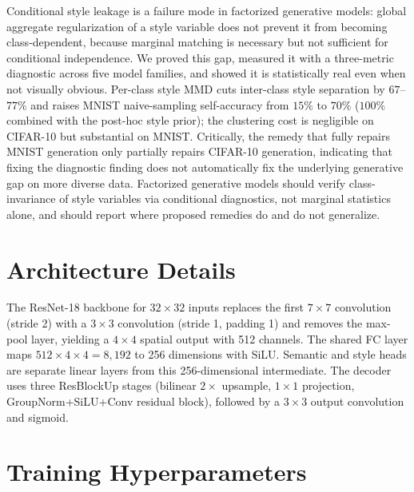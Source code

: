 \documentclass[10pt,letterpaper]{article}
\begin{document}
Conditional style leakage is a failure mode in factorized generative models:
global aggregate regularization of a style variable does not prevent it from
becoming class-dependent, because marginal matching is necessary but not
sufficient for conditional independence. We proved this gap, measured it
with a three-metric diagnostic across five model families, and showed it is
statistically real even when not visually obvious. Per-class style MMD cuts
inter-class style separation by $67$--$77\%$ and raises MNIST naive-sampling
self-accuracy from $15\%$ to $70\%$ ($100\%$ combined with the post-hoc
style prior); the clustering cost is negligible on CIFAR-10 but substantial
on MNIST. Critically, the remedy that fully repairs MNIST generation only
partially repairs CIFAR-10 generation, indicating that fixing the diagnostic
finding does not automatically fix the underlying generative gap on more
diverse data. Factorized generative models should verify class-invariance of
style variables via conditional diagnostics, not marginal statistics alone,
and should report where proposed remedies do and do not generalize.




\appendix

\section{Architecture Details}
\label{app:arch}

The ResNet-18 backbone for $32\times32$ inputs replaces the first
$7\times7$ convolution (stride 2) with a $3\times3$ convolution (stride 1,
padding 1) and removes the max-pool layer, yielding a $4\times4$ spatial
output with 512 channels. The shared FC layer maps
$512\times4\times4{=}8{,}192$ to 256 dimensions with SiLU. Semantic and
style heads are separate linear layers from this 256-dimensional
intermediate. The decoder uses three ResBlockUp stages (bilinear
$2\times$ upsample, $1\times1$ projection, GroupNorm+SiLU+Conv residual
block), followed by a $3\times3$ output convolution and sigmoid.

\section{Training Hyperparameters}
\label{app:training}
\end{document}
